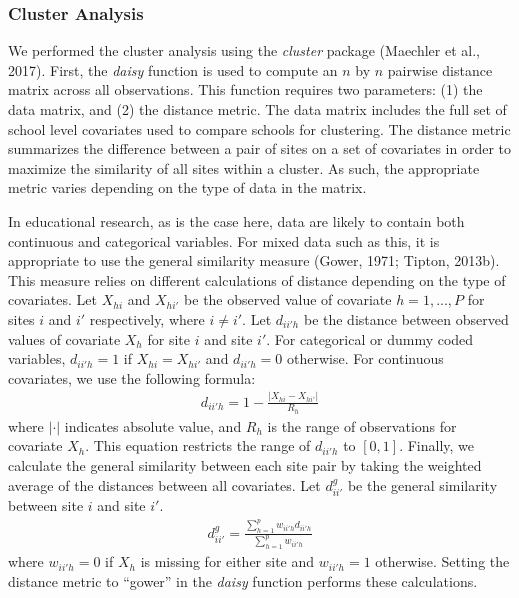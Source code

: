\documentclass[man,floatsintext]{apa6}
\begin{document}
\hypertarget{cluster-analysis}{%
\subsubsection{Cluster Analysis}\label{cluster-analysis}}

We performed the cluster analysis using the \emph{cluster} package (Maechler et al., 2017). First, the \emph{daisy} function is used to compute an \(n\) by \(n\) pairwise distance matrix across all observations. This function requires two parameters: (1) the data matrix, and (2) the distance metric. The data matrix includes the full set of school level covariates used to compare schools for clustering. The distance metric summarizes the difference between a pair of sites on a set of covariates in order to maximize the similarity of all sites within a cluster. As such, the appropriate metric varies depending on the type of data in the matrix.

In educational research, as is the case here, data are likely to contain both continuous and categorical variables. For mixed data such as this, it is appropriate to use the general similarity measure (Gower, 1971; Tipton, 2013b). This measure relies on different calculations of distance depending on the type of covariates. Let \(X_{hi}\) and \(X_{hi'}\) be the observed value of covariate \(h = {1, ..., P}\) for sites \(i\) and \(i'\) respectively, where \(i \ne i'\). Let \(d_{ii'h}\) be the distance between observed values of covariate \(X_{h}\) for site \(i\) and site \(i'\). For categorical or dummy coded variables, \(d_{ii'h} = 1\) if \(X_{hi} = X_{hi'}\) and \(d_{ii'h} = 0\) otherwise. For continuous covariates, we use the following formula:
\begin{align}
d_{ii'h} = 1 - \frac{|X_{hi} - X_{hi'}|}{R_h}
\end{align}
where \(|\cdot|\) indicates absolute value, and \(R_h\) is the range of observations for covariate \(X_h\). This equation restricts the range of \(d_{ii'h}\) to \([0,1]\). Finally, we calculate the general similarity between each site pair by taking the weighted average of the distances between all covariates. Let \(d^{g}_{ii'}\) be the general similarity between site \(i\) and site \(i'\).
\begin{align}
d^{g}_{ii'} = \frac{\sum^p_{h = 1}w_{ii'h}d_{ii'h}}{\sum^p_{h = 1}w_{ii'h}}
\end{align}
where \(w_{ii'h} = 0\) if \(X_h\) is missing for either site and \(w_{ii'h} = 1\) otherwise. Setting the distance metric to \enquote{gower} in the \emph{daisy} function performs these calculations.
\end{document}
